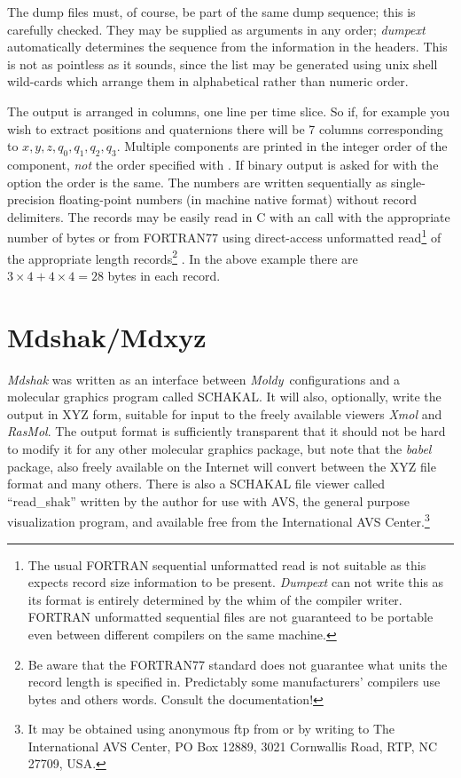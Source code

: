 \documentclass[a4paper,twoside]{report}
\newcommand{\moldy}{\emph{Moldy}}
\begin{document}
The dump files must, of course, be part of the same dump sequence;
this is carefully checked.  They may be supplied as arguments in any
order; \emph{dumpext} automatically determines the sequence from
the information in the headers.  This is not as pointless as it sounds,
since the list may be generated using unix shell wild-cards which arrange
them in alphabetical rather than numeric order.

The output is arranged in columns, one line per time slice.  So if,
for example you wish to extract positions and quaternions there will
be 7 columns corresponding to $x,y,z,q_0,q_1,q_2,q_3$. Multiple
components are printed in the integer order of the component,
\emph{not} the order specified with . If binary output is
asked for with the  option the order is the same. The numbers
are written sequentially as single-precision floating-point numbers
(in machine native format) without record delimiters.  The records may
be easily read in C with an  call with the appropriate
number of bytes or from FORTRAN77 using direct-access unformatted
read\footnote{The usual FORTRAN sequential unformatted read is not
  suitable as this expects record size information to be present.
  \emph{Dumpext} can not write this as its format is entirely
  determined by the whim of the compiler writer.  FORTRAN unformatted
  sequential files are not guaranteed to be portable even between
  different compilers on the same machine.} of the appropriate length
records\footnote{Be aware that the FORTRAN77 standard does not
  guarantee what units the record length is specified in.  Predictably
  some manufacturers' compilers use bytes and others words.  Consult
  the documentation!} .  In
the above example there are $3 \times 4 + 4 \times 4 = 28$ bytes in
each record.
\section{Mdshak/Mdxyz}%
\emph{Mdshak} was written as an interface between \moldy\ 
configurations and a molecular graphics program called
SCHAKAL\cite{schakal:88}.  It will also, optionally, write the output
in XYZ form, suitable for input to the freely available viewers
\emph{Xmol} and \emph{RasMol}.  The output format is sufficiently
transparent that it should not be hard to modify it for any other
molecular graphics package, but note that the \emph{babel} package,
also freely available on the Internet will convert between the XYZ
file format and many others. There is also a SCHAKAL file viewer
called ``read\_shak'' written by the author for use with AVS, the
general purpose visualization program, and available free from the
International AVS Center.\footnote{It may be obtained using anonymous
  ftp from \Lit{avs.ncsc.org} or by writing to The International AVS
  Center, PO Box 12889, 3021 Cornwallis Road, RTP, NC 27709, USA.}
\end{document}
